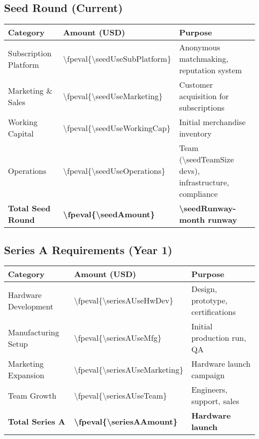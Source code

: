 \documentclass[11pt]{article}
\newcommand{\numint}[1]{\num[round-precision=0]{\fpeval{#1}}}
\begin{document}
\subsection{Seed Round (Current)}
\begin{table}[H]
\centering
\begin{tabularx}{\linewidth}{l Y Y}
\toprule
Category & Amount (USD) & Purpose \\\midrule
Subscription Platform & \numint{\seedUseSubPlatform} & Anonymous matchmaking, reputation system \\
Marketing \& Sales & \numint{\seedUseMarketing} & Customer acquisition for subscriptions \\
Working Capital & \numint{\seedUseWorkingCap} & Initial merchandise inventory \\
Operations & \numint{\seedUseOperations} & Team (\num{\seedTeamSize} devs), infrastructure, compliance \\
\textbf{Total Seed Round} & \textbf{\numint{\seedAmount}} & \textbf{\num{\seedRunway}-month runway} \\
\bottomrule
\end{tabularx}
\end{table}

\subsection{Series A Requirements (Year 1)}
\begin{table}[H]
\centering
\begin{tabularx}{\linewidth}{l Y Y}
\toprule
Category & Amount (USD) & Purpose \\\midrule
Hardware Development\cite{ycombinator2022} & \numint{\seriesAUseHwDev} & Design, prototype, certifications \\
Manufacturing Setup & \numint{\seriesAUseMfg} & Initial production run, QA \\
Marketing Expansion & \numint{\seriesAUseMarketing} & Hardware launch campaign \\
Team Growth & \numint{\seriesAUseTeam} & Engineers, support, sales \\
\textbf{Total Series A} & \textbf{\numint{\seriesAAmount}} & \textbf{Hardware launch} \\
\bottomrule
\end{tabularx}
\end{table}
\end{document}

